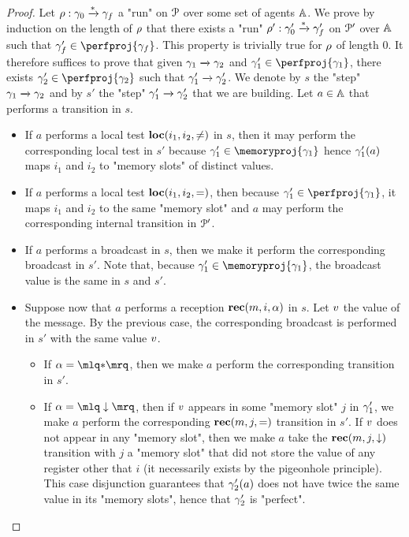 \begin{proof}
	Let $\rho: \gamma_0 \xrightarrow{*} \gamma_f$ a "run" on $\mathcal{P}$ over some set of agents $\mathbb{A}$. We prove by induction on the length of $\rho$ that there exists a "run" $\rho': \gamma_0' \xrightarrow{*} \gamma_f'$ on $\mathcal{P}'$ over $\mathbb{A}$ such that $\config_f' \in \perfproj{\config_f}$. This property is trivially true for $\rho$ of length $0$. It therefore suffices to prove that given $\gamma_1 \xrightarrow{} \gamma_2$ and $\config_1' \in \perfproj{\config_1}$, there exists $\config_2' \in \perfproj{\config_2}$ such that $\gamma_1' \xrightarrow{} \gamma_2'$. We denote by $s$ the "step" $\gamma_1 \xrightarrow{} \gamma_2$ and by $s'$ the "step" $\gamma'_1 \xrightarrow{} \gamma'_2$ that we are building. 
	Let $a \in \mathbb{A}$ that performs a transition in $s$.
	\begin{itemize}
	\item If $a$ performs a local test $\textbf{loc}(i_1,i_2,{\ne})$ in $s$, then it may perform the corresponding local test in $s'$ because $\config_1' \in \memoryproj{\config_1}$ hence $\gamma_1'(a)$ maps $i_1$ and $i_2$ to "memory slots" of distinct values. 
	\item If $a$ performs a local test  $\textbf{loc}(i_1,i_2,{=})$, then because $\config_1'\in \perfproj{\config_1}$, it maps $i_1$ and $i_2$ to the same "memory slot" and $a$ may perform the corresponding internal transition in $\mathcal{P}'$.  
	\item If $a$ performs a broadcast in $s$, then we make it perform the corresponding broadcast in $s'$. Note that, because $\config_1' \in \memoryproj{\config_1}$, the broadcast value is the same in $s$ and $s'$. 
	\item 
	Suppose now that $a$ performs a reception $\textbf{rec}(m, i, \alpha)$ in $s$. Let $v$ the value of the message. By the previous case, the corresponding broadcast is performed in $s'$ with the same value $v$. 
		\begin{itemize}
		\item If $\anact = \quotemarks{\dummyact}$, then we make $a$ perform the corresponding transition in $s'$. 
		\item If $\anact = \quotemarks{\enregact}$, then if $v$ appears in some "memory slot" $j$ in $\gamma_1'$, we make $a$ perform the corresponding $\textbf{rec}(m, j, {=})$ transition in $s'$. 
		If $v$ does not appear in any "memory slot", then we make $a$ take the $\textbf{rec}(m, j, \downarrow)$ transition with $j$ a "memory slot" that did not store the value of any register other that $i$ (it necessarily exists by the pigeonhole principle). This case disjunction guarantees that $\gamma_2'(a)$ does not have twice the same value in its "memory slots", hence that $\gamma_2'$ is "perfect".

\end{itemize}
\end{itemize}
\end{proof}
